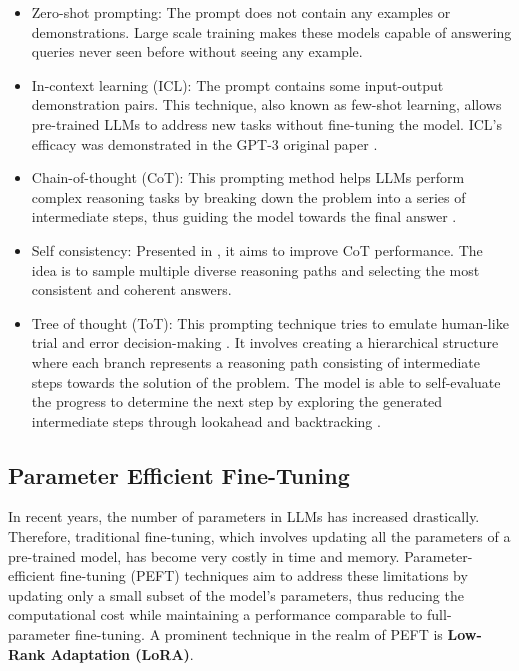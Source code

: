 \documentclass[11pt,english,listoffigures,listoftables]{tfgetsinf}
\begin{document}
\begin{itemize}
    \item Zero-shot prompting: The prompt does not contain any examples or demonstrations. Large scale training makes these models capable of answering queries never seen before without seeing any example.

    \item In-context learning (ICL): The prompt contains some input-output demonstration pairs. This technique, also known as few-shot learning, allows pre-trained LLMs to address new tasks without fine-tuning the model. ICL's efficacy was demonstrated in the GPT-3 original paper \cite{brown2020gpt3}.

    \item Chain-of-thought (CoT): This prompting method helps LLMs perform complex reasoning tasks by breaking down the problem into a series of intermediate steps, thus guiding the model towards the final answer \cite{wei2022chain}.

    \item Self consistency: Presented in \cite{wang2022self}, it aims to improve CoT performance. The idea is to sample multiple diverse reasoning paths and selecting the most consistent and coherent answers.  

    \item Tree of thought (ToT): This prompting technique tries to emulate human-like trial and error decision-making \cite{long2023ToT}. It involves creating a hierarchical structure where each branch represents a reasoning path consisting of intermediate steps towards the solution of the problem. The model is able to self-evaluate the progress to determine the next step by exploring the generated intermediate steps through lookahead and backtracking \cite{yao2024ToT}.
\end{itemize}

\subsection{Parameter Efficient Fine-Tuning}

In recent years, the number of parameters in LLMs has increased drastically. Therefore, traditional fine-tuning, which involves updating all the parameters of a pre-trained model, has become very costly in time and memory. Parameter-efficient fine-tuning (PEFT) \cite{han2024peft} techniques aim to address these limitations by updating only a small subset of the model's parameters, thus reducing the computational cost while maintaining a performance comparable to full-parameter fine-tuning. A prominent technique in the realm of PEFT is \textbf{Low-Rank Adaptation (LoRA)}\cite{hu2021lora}.
\end{document}
